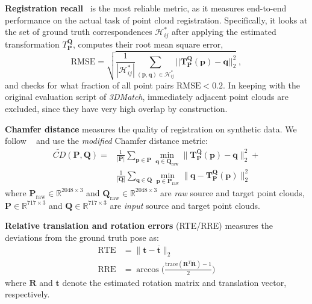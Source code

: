 \textbf{Registration recall}~\cite{choi2015robust} is the most reliable metric, as it measures end-to-end performance on the actual task of point cloud registration. Specifically, it looks at the set of ground truth correspondences $\mathcal{H}_{i j}^{*}$ after applying the estimated transformation $T_\mathbf{P}^ \mathbf{Q}$, computes their root mean square error,
\begin{equation}
    \mathrm{RMSE} = \sqrt{\frac{1}{\left|\mathcal{H}_{i j}^{*}\right|} \sum_{\left(\mathbf{p}, \mathbf{q}\right) \in \mathcal{H}_{i j}^{*}}||\mathbf{T}_\mathbf{P}^ \mathbf{Q}(\mathbf{p}) -\mathbf{q}||_2^2}\;,
\end{equation}
and checks for what fraction of all point pairs $\mathrm{RMSE}\!<\!0.2$.
In keeping with the original evaluation script of \emph{3DMatch}, immediately adjacent point clouds are excluded, since they have very high overlap by construction.



\textbf{Chamfer distance} measures the quality of registration on synthetic data. We follow ~\cite{yew2020rpm} and use the \emph{modified} Chamfer distance metric:
\begin{equation}
\begin{aligned}
\tilde{C D}(\mathbf{P}, \mathbf{Q}) = & \frac{1}{|\mathbf{P}|} \sum\limits_{\mathbf{p} \in \mathbf{P}} \min\limits_{\mathbf{q} \in \mathbf{Q}_{\text{raw}}}\|\mathbf{T}_\mathbf{P}^ \mathbf{Q}(\mathbf{p})-\mathbf{q}\|_{2}^{2} + \\
& \frac{1}{|\mathbf{Q}|} \sum\limits_{\mathbf{q} \in \mathbf{Q}} \min\limits_{\mathbf{p} \in \mathbf{P}_{\text{raw}}}\|\mathbf{q}- \mathbf{T}_\mathbf{P}^ \mathbf{Q}(\mathbf{p})\|_{2}^{2}
\end{aligned}
\end{equation}
where $\mathbf{P}_{\text{raw}}\in \mathbb{R}^{2048\times3}$ and $\mathbf{Q}_{\text{raw}}\in \mathbb{R}^{2048\times3}$ are \emph{raw} source and target point clouds, $\mathbf{P} \in \mathbb{R}^{717\times3}$ and $\mathbf{Q} \in \mathbb{R}^{717\times3}$ are \emph{input} source and target point clouds. 

\textbf{Relative translation and rotation errors} (RTE/RRE) measures the deviations from the ground truth pose as: 
\begin{equation}
\begin{aligned}
\text{RTE} &= \|\mathbf{t} - \overbar{\mathbf{t}}\|_2\\
\text{RRE} &=\arccos\big(\frac{\mathrm{trace}{(\mathbf{R}^{T}\overbar{\mathbf{R}})-1}}{2}\big)
\end{aligned}
\end{equation}
where $\mathbf{R}$ and $\mathbf{t}$ denote the estimated rotation matrix and translation vector, respectively.


